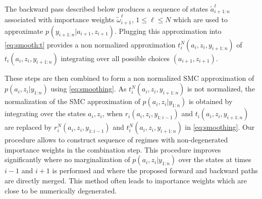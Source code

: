 The backward pass described below produces a sequence of states $\tilde{a}_{i+1:n}^{\ell}$ associated with importance weights $\tilde{\omega}_{i+1}^{\ell}$, $1\le \ell\le N$ which are used to approximate $p_{}(y_{i+1:n}|a_{i+1},z_{i+1})$. Plugging this approximation into \eqref{eq:smooth:t} provides a non normalized approximation $t^N_{i}(a_i,z_i,y_{i+1:n})$ of $t_{i}(a_i,z_i,y_{i+1:n})$ integrating over all possible choices $(a_{i+1},z_{i+1})$.


These steps are then combined to form a non normalized SMC approximation of $p(a_{i},z_{i}|y_{1:n})$ using \eqref{eq:smoothing}. As $t^N_{i}(a_i,z_i,y_{i+1:n})$ is not normalized, the normalization of the SMC approximation of $p(a_{i},z_{i}|y_{1:n})$ is obtained by integrating over the states $a_{i},z_{i}$, when $r_{i}(a_{i},z_{i},y_{1:i-1})$ and $t_{i}(a_i,z_i,y_{i+1:n})$ are replaced by $r^N_{i}(a_{i},z_{i},y_{1:i-1})$ and $t^N_{i}(a_i,z_i,y_{i+1:n})$ in \eqref{eq:smoothing}. %
Our procedure allows to construct sequence of regimes with non-degenerated importance weights in the combination step. This procedure improves significantly \cite{briers:doucet:maskell:2010} where no marginalization of $p(a_{i},z_{i}|y_{1:n})$ over the states at times $i-1$ and $i+1$ is performed and where the proposed forward and backward paths are directly merged. This method often leads to importance weights which are close to be numerically degenerated.

